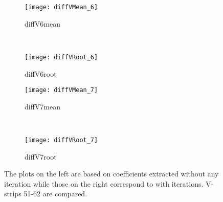 \begin{figure}[h]
    \centering
    \begin{subfigure}[h]{0.44\textwidth}
        \centering
        \texttt{[image: diffVMean\_6]}
        \caption{diffV6mean}
        \label{fig:diffV6mean}
    \end{subfigure}
    ~
    \begin{subfigure}[h]{0.44\textwidth}
        \centering
        \texttt{[image: diffVRoot\_6]}
        \caption{diffV6root}
        \label{fig:diffV6root}
    \end{subfigure}
    
    \begin{subfigure}[h]{0.44\textwidth}
        \centering
        \texttt{[image: diffVMean\_7]}
        \caption{diffV7mean}
        \label{fig:diffV7mean}
    \end{subfigure}
    ~
    \begin{subfigure}[h]{0.44\textwidth}
        \centering
        \texttt{[image: diffVRoot\_7]}
        \caption{diffV7root}
        \label{fig:diffV7root}
    \end{subfigure}
    \caption{The plots on the left are based on coefficients extracted without any iteration while those on the right correspond to with 
    iterations. V-strips 51-62 are compared.}
    \label{fig:diffV}
\end{figure}

